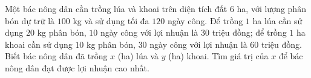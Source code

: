 \begin{bt}%
	Một bác nông dân cần trồng lúa và khoai trên diện tích đất $6$ ha, với lượng phân bón dự trữ là $100$ kg và sử dụng tối đa $120$ ngày công. Để trồng $1$ ha lúa cần sử dụng $20$ kg phân bón, $10$ ngày công với lợi nhuận là $30$ triệu đồng; để trồng $1$ ha khoai cần sử dụng $10$ kg phân bón, $30$ ngày công với lợi nhuận là $60$ triệu đồng. Biết bác nông dân đã trồng $x$ (ha) lúa và $y$ (ha) khoai. Tìm giá trị của $x$ để bác nông dân đạt được lợi nhuận cao nhất.
\end{bt}
